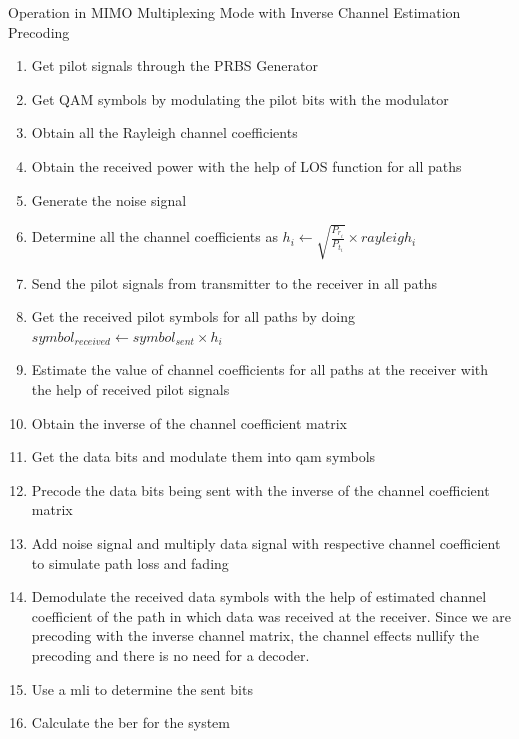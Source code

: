\begin{algorithm}[!htbp]
\caption{Operation in MIMO Multiplexing Mode with Inverse Channel Estimation Precoding}
\label{alg:Operation in MIMO Inverse Channel Estimation Mode}
\begin{enumerate}
\item Get pilot signals through the PRBS Generator
\item Get QAM symbols by modulating the pilot bits with the modulator
\item Obtain all the Rayleigh channel coefficients
\item Obtain the received power with the help of LOS function for all  paths
\item Generate the noise signal
\item Determine all the channel coefficients as $h_i \gets \sqrt{\frac{P_{r_i}}{P_{t_i}}} \times rayleigh_i$
\item Send the pilot signals from transmitter to the receiver in all paths
\item Get the received pilot symbols for all paths by doing $symbol_{received} \gets symbol_{sent} \times h_i$
\item Estimate the value of channel coefficients for all paths at the receiver with the help of received pilot signals
\item Obtain the inverse of the channel coefficient matrix
\item Get the data bits and modulate them into \acrshort{qam} symbols
\item Precode the data bits being sent with the inverse of the channel coefficient matrix
\item Add noise signal and multiply data signal with respective channel coefficient to simulate path loss and fading
\item Demodulate the received data symbols with the help of estimated channel coefficient of the path in which data was received at the receiver. Since we are precoding with the inverse channel matrix, the channel effects nullify the precoding and there is no need for a decoder.
\item Use a \acrlong{mli} to determine the sent bits
\item Calculate the \acrshort{ber} for the system
\end{enumerate}
\end{algorithm}

